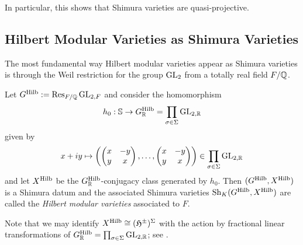 \documentclass[main.tex]{subfiles}
\begin{document}
In particular, this shows that Shimura varieties are quasi-projective. 


\subsection{Hilbert Modular Varieties as Shimura Varieties}

The most fundamental way Hilbert modular varieties appear as Shimura varieties is through the Weil restriction for the group $\mathrm{GL}_2$ from a totally real field $F / \mathbb{Q}$.

\begin{defn}
Let $G^{\operatorname{\mathrm{Hilb}}} := \operatorname{\mathrm{Res}}_{F/\mathbb{Q}} \mathrm{GL}_{2,F}$ and consider the homomorphism
\[ h_0 : \mathbb{S} \to G^{\operatorname{\mathrm{Hilb}}}_{\mathbb{R}} = \prod_{\sigma \in \Sigma} \mathrm{GL}_{2, \mathbb{R}} \]
given by 
\[ x + i y \mapsto \left( 
\begin{pmatrix}
x & -y
\\
y & x
\end{pmatrix},
\dots,
\begin{pmatrix}
x & -y
\\
y & x
\end{pmatrix} \right) \in \prod_{\sigma \in \Sigma} \mathrm{GL}_{2, \mathbb{R}} \]
and let $X^{\operatorname{\mathrm{Hilb}}}$ be the $G^{\operatorname{\mathrm{Hilb}}}_{\mathbb{R}}$-conjugacy class generated by $h_0$. Then $(G^{\operatorname{\mathrm{Hilb}}}, X^{\operatorname{\mathrm{Hilb}}})$ is a Shimura datum and the associated Shimura varieties $\mathrm{Sh}_K(G^{\operatorname{\mathrm{Hilb}}}, X^{\operatorname{\mathrm{Hilb}}})$ are called the \textit{Hilbert modular varieties} associated to $F$.
\end{defn}
Note that we may identify $X^{\operatorname{\mathrm{Hilb}}} \cong (\mathfrak{H}^{\pm})^{\Sigma}$ with the action by fractional linear transformations of $G^{\operatorname{\mathrm{Hilb}}}_{\mathbb{R}} = \prod_{\sigma \in \Sigma} \mathrm{GL}_{2, \mathbb{R}}$; see \cite[Example~1.23]{milne:shimura_varieties}.
\end{document}
